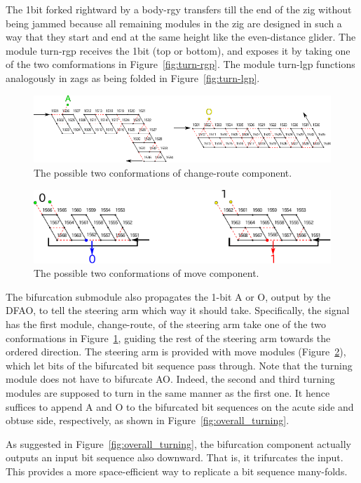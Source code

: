 The 1bit forked rightward by a body-rgy transfers till the end of the zig without being jammed because all remaining modules in the zig are designed in such a way that they start and end at the same height like the even-distance glider.
The module turn-rgp receives the 1bit (top or bottom), and exposes it by taking one of the two comformations in Figure~\ref{fig:turn-rgp}.
The module turn-lgp functions analogously in zags as being folded in Figure~\ref{fig:turn-lgp}.

\begin{figure}[h]
\centering
\includegraphics[width=\linewidth]{pic/change_route.pdf}
\caption{The possible two conformations of change-route component.}
\label{fig:change_route}
\end{figure}

\begin{figure}[h]
\centering
\includegraphics[width=\linewidth]{pic/move.pdf}
\caption{The possible two conformations of move component.}
\label{fig:move}
\end{figure}

The bifurcation submodule also propagates the 1-bit A or O, output by the DFAO, to tell the steering arm which way it should take.
Specifically, the signal has the first module, change-route, of the steering arm take one of the two conformations in Figure~\ref{fig:change_route}, guiding the rest of the steering arm towards the ordered direction.
The steering arm is provided with move modules (Figure~\ref{fig:move}), which let bits of the bifurcated bit sequence pass through.  
Note that the turning module does not have to bifurcate AO.
Indeed, the second and third turning modules are supposed to turn in the same manner as the first one.
It hence suffices to append A and O to the bifurcated bit sequences on the acute side and obtuse side, respectively, as shown in Figure~\ref{fig:overall_turning}.

\begin{remark}
As suggested in Figure~\ref{fig:overall_turning}, the bifurcation component actually outputs an input bit sequence also downward.
That is, it trifurcates the input.
This provides a more space-efficient way to replicate a bit sequence many-folds.
\end{remark}

